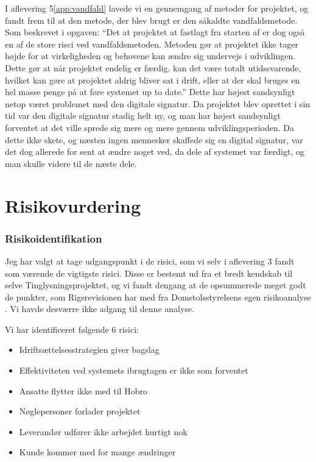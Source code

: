 \documentclass[10pt,a4paper,danish]{article}
\begin{document}
I aflevering 5\ref{app:vandfald} lavede vi en gennemgang af metoder for projektet, og fandt frem til at den metode, der blev brugt er den såkaldte vandfaldsmetode. Som beskrevet i opgaven: "`Det at projektet at fastlagt fra starten af er dog også en af de store risci ved vandfaldsmetoden. Metoden gør at projektet ikke tager højde for at virkeligheden og behovene kan ændre sig undervejs i udviklingen. Dette gør at når projektet endelig er færdig, kan det være totalt utidssvarende, hvilket kan gøre at projektet aldrig bliver sat i drift, eller at der skal bruges en hel masse penge på at føre systemet up to date."' Dette har højest sandsynligt netop været problemet med den digitale signatur. Da projektet blev oprettet i sin tid var den digitale signatur stadig helt ny, og man har højest sandsynligt forventet at det ville sprede sig mere og mere gennem udviklingsperioden. Da dette ikke skete, og næsten ingen mennesker skaffede sig en digital signatur, var det dog allerede for sent at ændre noget ved, da dele af systemet var færdigt, og man skulle videre til de næste dele.




\section{Risikovurdering}






\subsubsection{Risikoidentifikation}
Jeg har valgt at tage udgangspunkt i de risici, som vi selv i aflevering 3 fandt som værende de vigtigste risici. Disse er bestemt ud fra et bredt kendskab til selve Tinglysningsprojektet, og vi fandt dengang at de opsummerede meget godt de punkter, som Rigsrevisionen har med fra Domstolsstyrelsens egen risikoanalyse \cite[~s. 18]{Rigs}. Vi havde desværre ikke adgang til denne analyse.

Vi har identificeret følgende 6 risici:
\begin{itemize}
\item Idriftsættelsesstrategien giver bagslag
\item Effektiviteten ved systemets ibrugtagen er ikke som forventet
\item Ansatte flytter ikke med til Hobro 
\item Nøglepersoner forlader projektet
\item Leverandør udfører ikke arbejdet hurtigt nok
\item Kunde kommer med for mange ændringer
\end{itemize}
\end{document}
